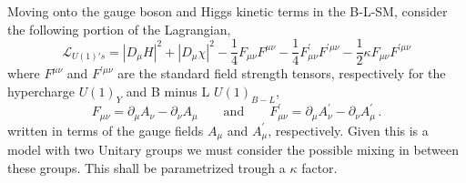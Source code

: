 Moving onto the gauge boson and Higgs kinetic terms in the B-L-SM, consider the following portion of the Lagrangian,
\begin{equation}
\mathcal{L}_{U(1)'s} =  \left| D_\mu H \right|^2 + \left| D_\mu \chi \right|^2 -\dfrac{1}{4} F_{\mu \nu} F^{\mu \nu} -\dfrac{1}{4} F^\prime_{\mu \nu} F^{\prime \mu \nu} -\dfrac{1}{2} \kappa F_{\mu \nu} F^{\prime \mu \nu}
\label{eq:Lu1}
\end{equation}
where $F^{\mu \nu}$ and $F^{\prime \mu \nu}$ are the standard field strength tensors, respectively for the hypercharge $U(1)_{Y}$ and B minus L $U(1)_{B-L}$, 
\begin{equation}
	F_{\mu \nu} = \partial_\mu A_\nu - \partial_\nu A_\mu 
	\qquad
	\text{and}
	\qquad
	 F^\prime_{\mu \nu} = \partial_\mu A^\prime_\nu - \partial_\nu A^\prime_\mu\,.
	 \label{eq:Fmn}
\end{equation}
written in terms of the gauge fields $A_\mu$ and $A_\mu^\prime$, respectively. Given this is a model with two Unitary groups we must consider the possible mixing in between these groups. This shall be parametrized trough a $\kappa$ factor.

